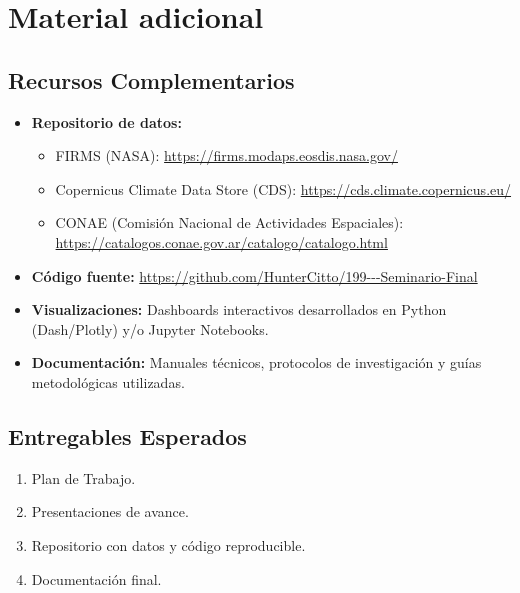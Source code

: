 \section{Material adicional}

\subsection{Recursos Complementarios}
\begin{itemize}
    \item \textbf{Repositorio de datos:} 
    \begin{itemize}
        \item FIRMS (NASA): \url{https://firms.modaps.eosdis.nasa.gov/}
        \item Copernicus Climate Data Store (CDS): \url{https://cds.climate.copernicus.eu/}
        \item CONAE (Comisión Nacional de Actividades Espaciales): \url{https://catalogos.conae.gov.ar/catalogo/catalogo.html}
    \end{itemize}
    \item \textbf{Código fuente:} \url{https://github.com/HunterCitto/199---Seminario-Final}
    \item \textbf{Visualizaciones:} Dashboards interactivos desarrollados en Python (Dash/Plotly) y/o Jupyter Notebooks.
    \item \textbf{Documentación:} Manuales técnicos, protocolos de investigación y guías metodológicas utilizadas.
\end{itemize}

\subsection{Entregables Esperados}
\begin{enumerate}
    \item Plan de Trabajo.
    \item Presentaciones de avance.
    \item Repositorio con datos y código reproducible.
    \item Documentación final.
\end{enumerate}